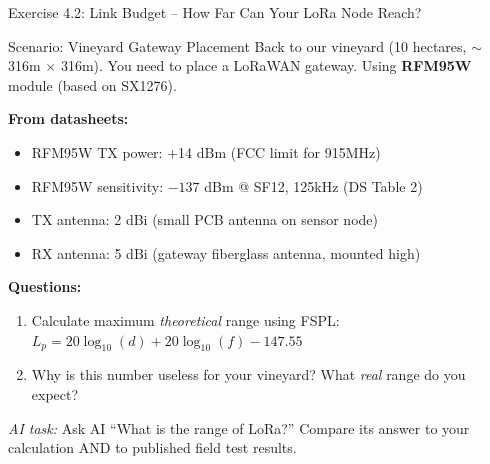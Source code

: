 \documentclass[aspectratio=169,11pt]{beamer}
\begin{document}
\begin{frame}{Exercise 4.2: Link Budget -- How Far Can Your LoRa Node Reach?}
    \begin{block}{Scenario: Vineyard Gateway Placement}
        Back to our vineyard (10 hectares, $\sim$316m $\times$ 316m). You need to place a LoRaWAN gateway. Using \textbf{RFM95W} module (based on SX1276).
        
        \vspace{0.2cm}
        \textbf{From datasheets:}
        \begin{itemize}
            \item RFM95W TX power: +14 dBm (FCC limit for 915MHz)
            \item RFM95W sensitivity: $-137$ dBm @ SF12, 125kHz (DS Table 2)
            \item TX antenna: 2 dBi (small PCB antenna on sensor node)
            \item RX antenna: 5 dBi (gateway fiberglass antenna, mounted high)
        \end{itemize}
    \end{block}
    
    \textbf{Questions:}
    \begin{enumerate}
        \item Calculate maximum \textit{theoretical} range using FSPL: $L_p = 20\log_{10}(d) + 20\log_{10}(f) - 147.55$
        \item Why is this number useless for your vineyard? What \textit{real} range do you expect?
    \end{enumerate}
    
    {\footnotesize \textit{AI task:} Ask AI ``What is the range of LoRa?'' Compare its answer to your calculation AND to published field test results.}
\end{frame}
\end{document}

